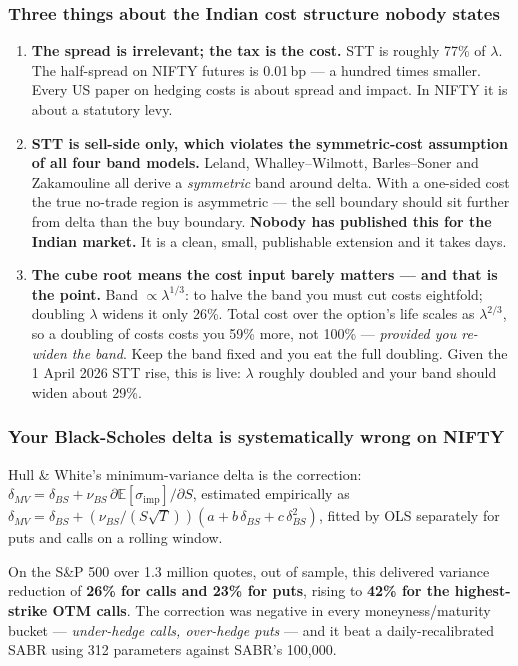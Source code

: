 \documentclass[11pt,a4paper]{article}
\begin{document}
\subsubsection{Three things about the Indian cost structure nobody states}

\begin{enumerate}
\item \textbf{The spread is irrelevant; the tax is the cost.} STT is roughly 77\%
of $\lambda$. The half-spread on NIFTY futures is 0.01\,bp --- a hundred times
smaller. Every US paper on hedging costs is about spread and impact. In NIFTY it
is about a statutory levy.
\item \textbf{STT is sell-side only, which violates the symmetric-cost assumption
of all four band models.} Leland, Whalley--Wilmott, Barles--Soner and Zakamouline
all derive a \emph{symmetric} band around delta. With a one-sided cost the true
no-trade region is asymmetric --- the sell boundary should sit further from delta
than the buy boundary. \textbf{Nobody has published this for the Indian market.}
It is a clean, small, publishable extension and it takes days.
\item \textbf{The cube root means the cost input barely matters --- and that is
the point.} Band $\propto \lambda^{1/3}$: to halve the band you must cut costs
eightfold; doubling $\lambda$ widens it only 26\%. Total cost over the option's
life scales as $\lambda^{2/3}$, so a doubling of costs costs you 59\% more, not
100\% --- \emph{provided you re-widen the band}. Keep the band fixed and you eat
the full doubling. Given the 1 April 2026 STT rise, this is live: $\lambda$
roughly doubled and your band should widen about 29\%.
\end{enumerate}

\subsubsection{Your Black-Scholes delta is systematically wrong on NIFTY}

Hull \& White's minimum-variance delta is the correction:
$\delta_{MV} = \delta_{BS} + \nu_{BS}\,\partial\mathbb{E}[\sigma_{\text{imp}}]/\partial S$,
estimated empirically as
$\delta_{MV} = \delta_{BS} + (\nu_{BS}/(S\sqrt{T}))(a + b\,\delta_{BS} + c\,\delta_{BS}^2)$,
fitted by OLS separately for puts and calls on a rolling window.

On the S\&P 500 over 1.3 million quotes, out of sample, this delivered variance
reduction of \textbf{26\% for calls and 23\% for puts}, rising to \textbf{42\% for
the highest-strike OTM calls}. The correction was negative in every
moneyness/maturity bucket --- \emph{under-hedge calls, over-hedge puts} --- and it
beat a daily-recalibrated SABR using 312 parameters against SABR's 100{,}000.
\end{document}
